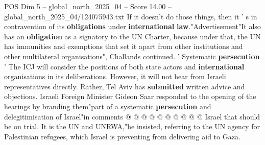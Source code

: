 \begin{textsample}{POS Dim 5 – global\_north\_2025\_04 – Score 14.00 – global\_north\_2025\_04/124075943.txt}
If it doesn't do those things, then it ' s in contravention of its \textbf{obligations} under \textbf{international} \textbf{law}."Advertisement"It also has an \textbf{obligation} as a signatory to the UN Charter, because under that, the UN has immunities and exemptions that set it apart from other institutions and other multilateral organisations", Challands continued. ' Systematic \textbf{persecution} ' The ICJ will consider the positions of both state actors and \textbf{international} organisations in its deliberations.
However, it will not hear from Israeli representatives directly.
Rather, Tel Aviv has \textbf{submitted} written advice and objections.
Israeli Foreign Minister Gideon Saar responded to the opening of the hearings by branding them"part of a systematic \textbf{persecution} and delegitimisation of Israel"in comments @ @ @ @ @ @ @ @ @ @ Israel that should be on trial.
It is the UN and UNRWA,"he insisted, referring to the UN agency for Palestinian refugees, which Israel is preventing from delivering aid to Gaza.

\end{textsample}
